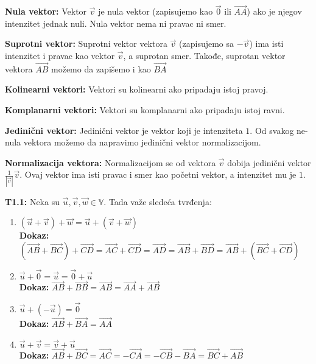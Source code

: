 \documentclass[12pt]{article}
\newcommand{\vek}[1]{\overrightarrow{#1}}
\begin{document}
\textbf{Nula vektor:} Vektor $\vek{v}$ je nula vektor (zapisujemo kao $\vek{0}$
ili $\vek{AA}$) ako je njegov intenzitet jednak nuli. Nula vektor nema ni
pravac ni smer.
\par

\textbf{Suprotni vektor:} Suprotni vektor vektora $\vek{v}$ (zapisujemo sa
$-\vek{v}$) ima isti intenzitet i pravac kao vektor $\vek{v}$, a suprotan smer.
Takođe, suprotan vektor vektora $\vek{AB}$ možemo da zapišemo i kao $\vek{BA}$
\par

\textbf{Kolinearni vektori:} Vektori su kolinearni ako pripadaju istoj pravoj.
\par

\textbf{Komplanarni vektori:} Vektori su komplanarni ako pripadaju istoj ravni.
\par

\textbf{Jedinični vektor:} Jedinični vektor je vektor koji je intenziteta $1$.
Od svakog ne-nula vektora možemo da napravimo jedinični vektor normalizacijom.
\par

\textbf{Normalizacija vektora:} Normalizacijom se od vektora $\vek{v}$ dobija
jedinični vektor $\frac{1}{|\vek{v}|}\vek{v}$. Ovaj vektor ima isti pravac
i smer kao početni vektor, a intenzitet mu je $1$.
\par

\textbf{T1.1:} Neka su $\vek{u}, \vek{v}, \vek{w}\in\mathbb{V}$. Tada važe
sledeća tvrđenja:
\begin{enumerate}[label=\textbf{(S\arabic*)}]
    \item $(\vek{u}+\vek{v})+\vek{w}=\vek{u}+(\vek{v}+\vek{w})$\\
          \textbf{Dokaz:}
          $(\vek{AB}+\vek{BC})+\vek{CD}=\vek{AC}+\vek{CD}=\vek{AD}=\vek{AB}+\vek{BD}
              =\vek{AB}+(\vek{BC}+\vek{CD})$
    \item
          $\vek{u}+\vek{0}=\vek{u}=\vek{0}+\vek{u}$\\
          \textbf{Dokaz:}
          $\vek{AB}+\vek{BB}=\vek{AB}=\vek{AA}+\vek{AB}$
    \item $\vek{u}+(-\vek{u})=\vek{0}$\\
          \textbf{Dokaz:}
          $\vek{AB}+\vek{BA}=\vek{AA}$
    \item $\vek{u}+\vek{v}=\vek{v}+\vek{u}$\\
          \textbf{Dokaz:}
          $\vek{AB}+\vek{BC}=\vek{AC}=-\vek{CA}=-\vek{CB}-\vek{BA}=\vek{BC}+\vek{AB}$
\end{enumerate}
\end{document}

